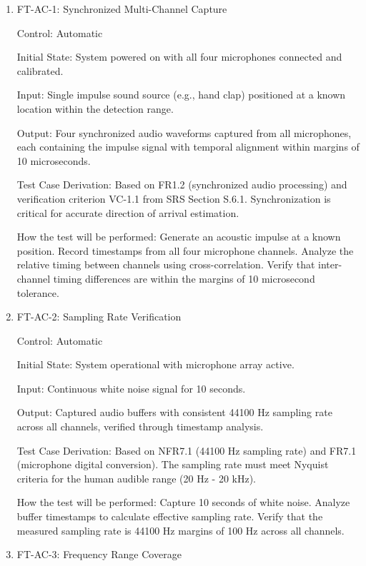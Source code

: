 \documentclass[12pt, titlepage]{article}
\begin{document}
\begin{enumerate}

\item{FT-AC-1: Synchronized Multi-Channel Capture\\}

Control: Automatic
					
Initial State: System powered on with all four microphones connected and
calibrated.
					
Input: Single impulse sound source (e.g., hand clap) positioned at a known
location within the detection range.
					
Output: Four synchronized audio waveforms captured from all microphones, each
containing the impulse signal with temporal alignment within margins of 10 microseconds.

Test Case Derivation: Based on FR1.2 (synchronized audio processing) and
verification criterion VC-1.1 from SRS Section S.6.1. Synchronization is
critical for accurate direction of arrival estimation.
					
How the test will be performed: Generate an acoustic impulse at a known position.
Record timestamps from all four microphone channels. Analyze the relative timing
between channels using cross-correlation. Verify that inter-channel timing
differences are within the margins of 10 microsecond tolerance.
					
\item{FT-AC-2: Sampling Rate Verification\\}

Control: Automatic
					
Initial State: System operational with microphone array active.
					
Input: Continuous white noise signal for 10 seconds.
					
Output: Captured audio buffers with consistent 44100 Hz sampling rate across all
channels, verified through timestamp analysis.

Test Case Derivation: Based on NFR7.1 (44100 Hz sampling rate) and FR7.1
(microphone digital conversion). The sampling rate must meet Nyquist criteria
for the human audible range (20 Hz - 20 kHz).

How the test will be performed: Capture 10 seconds of white noise. Analyze buffer
timestamps to calculate effective sampling rate. Verify that the measured
sampling rate is 44100 Hz margins of 100 Hz across all channels.

\item{FT-AC-3: Frequency Range Coverage\\}


\end{enumerate}
\end{document}
